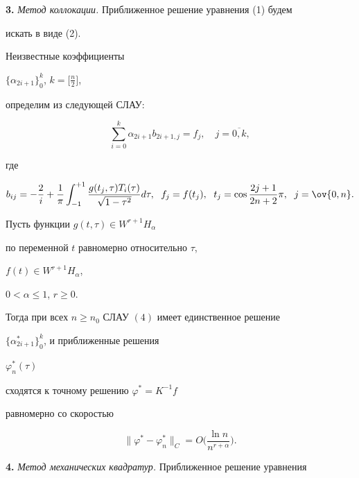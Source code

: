 {\bf 3.} {\it Метод коллокации.} Приближенное решение уравнения (1) будем


искать в виде (2).


Неизвестные коэффициенты


$\{\alpha_{2i+1}\}_{0}^{k}$, $k=\big[\frac{n}{2}\big]$,


определим из следующей СЛАУ:


\begin{equation}


\sum_{i=0}^{k} \alpha_{2i+1} b_{2i+1,j} = f_{j},\quad


j=\overline{0,k},


\end{equation}


где


$$


b_{ij} = -\frac{2}{i} +


\frac{1}{\pi}\int^{+1}_{-1}\frac{g(t_j,\tau) T_{i}(\tau) }


{\sqrt{1-\tau^2}}d\tau,\ \;


f_j =f(t_j),\ \; t_j=\cos\frac{2j+1}{2n+2}\pi,\ \; j=\ov{0,n}.


$$





\begin{thm}


Пусть функции $g(t,\tau) \in W^{r+1} H_{\alpha}$


по переменной $t$ равномерно относительно $\tau$,


$f(t) \in W^{r+1} H_{\alpha}$,


$0< \alpha \leq 1$, $r \geq 0$.


Тогда при всех $n \ge n_0$ СЛАУ $(4)$ имеет единственное решение


$\{ \alpha_{2i+1}^*\}_{0}^{k}$, и приближенные решения


$\varphi_n^*(\tau)$


сходятся к точному решению $\varphi^* =K^{-1} f$


равномерно со скоростью


$$


\|\varphi^* - \varphi_n^*\|_C = O\bigg(\frac{\ln n}{n^{r+\alpha}}\bigg).


$$


\end{thm}





{\bf 4.} {\it Метод механических квадратур.} Приближенное решение уравнения


